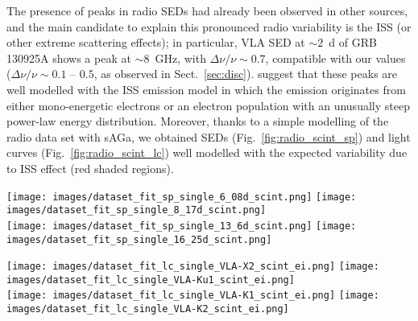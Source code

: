 \documentclass{aa}
\begin{document}
The presence of peaks in radio SEDs had already been observed in other sources, and the main candidate to explain this pronounced radio variability is the ISS (or other extreme scattering effects); in particular, VLA SED at $\sim 2$~d of GRB\,130925A \citep{Horesh15} shows a peak at $\sim 8$~GHz, with $\Delta \nu / \nu\sim 0.7$, compatible with our values ($\Delta \nu / \nu \sim 0.1$ -- $0.5$, as observed in Sect.~\ref{sec:disc}).
\citet{Horesh15} suggest that these peaks are well modelled with the ISS emission model in which the emission originates from either mono-energetic electrons or an electron population with an unusually steep power-law energy distribution.
%
Moreover, thanks to a simple modelling of the radio data set with {\sc sAGa}, we obtained SEDs (Fig.~\ref{fig:radio_scint_sp}) and light curves (Fig.~\ref{fig:radio_scint_lc}) well modelled with the expected variability due to ISS effect (red shaded regions).
%
\begin{figure*} %
\centering
{\texttt{[image: images/dataset\_fit\_sp\_single\_6\_08d\_scint.png]}} \quad
{\texttt{[image: images/dataset\_fit\_sp\_single\_8\_17d\_scint.png]}} \\
{\texttt{[image: images/dataset\_fit\_sp\_single\_13\_6d\_scint.png]}} \quad
{\texttt{[image: images/dataset\_fit\_sp\_single\_16\_25d\_scint.png]}} \\
\caption{Radio SEDs of GRB\,160131A at $0.8$~d (top left), $1.7$~d (top right), $5.8$~d (bottom left), and $25.8$~d (bottom right), obtained through a radio modelling for a FS model in ISM; we considered a jetted (edge-regime) emission with ISS effect.
Filled circles indicate detections, and upside down triangles indicate $3\sigma$ upper limits; the red shaded regions represent the expected variability due to ISS effect, obtained through the prescription described in \citet{Misra19}.}
\label{fig:radio_scint_sp}
\end{figure*}
%
\begin{figure*} %
\centering
{\texttt{[image: images/dataset\_fit\_lc\_single\_VLA-X2\_scint\_ei.png]}} \quad
{\texttt{[image: images/dataset\_fit\_lc\_single\_VLA-Ku1\_scint\_ei.png]}} \\
{\texttt{[image: images/dataset\_fit\_lc\_single\_VLA-K1\_scint\_ei.png]}} \quad
{\texttt{[image: images/dataset\_fit\_lc\_single\_VLA-K2\_scint\_ei.png]}} \\
\caption{Radio light curves of GRB\,160131A at $11.4$~GHz (top left), $13$~GHz (top right), $18.8$~GHz (bottom left), and $24.6$~GHz (bottom right), obtained through a radio modelling (from radio to X-ray frequencies) for a FS model in ISM; we considered a jetted (edge-regime) emission with ISS effect, dust extinction and energy injection.
Filled circles indicate detections, and upside down triangles indicate $3\sigma$ upper limits; the red shaded regions represent the expected variability due to ISS effect, obtained through the prescription described in \citet{Misra19}.}
\label{fig:radio_scint_lc}
\end{figure*}
\end{document}

